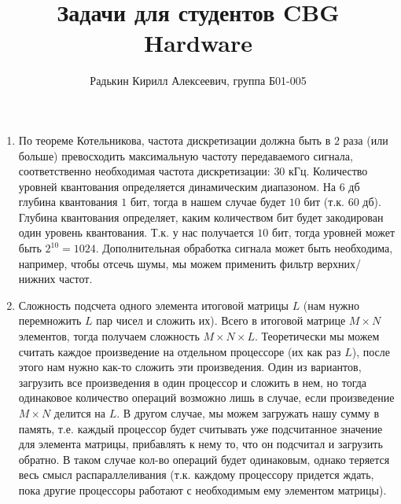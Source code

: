 \documentclass[a4paper, 12pt]{article}
\author{Радькин Кирилл Алексеевич, группа Б01-005}
\date{}
\title{Задачи для студентов CBG Hardware}
\begin{document}
    \maketitle

    \begin{enumerate}
        \item По теореме Котельникова, частота дискретизации должна быть в $2$ раза (или больше) превосходить максимальную частоту передаваемого сигнала, соответственно необходимая частота дискретизации: $30$ кГц.
        Количество уровней квантования определяется динамическим диапазоном. На $6$ дб глубина квантования $1$ бит, тогда в нашем случае будет $10$ бит (т.к. $60$ дб). Глубина квантования определяет, каким количеством бит будет закодирован один уровень квантования. Т.к. у нас получается $10$ бит, тогда уровней может быть $2^{10} = 1024$.
        Дополнительная обработка сигнала может быть необходима, например, чтобы отсечь шумы, мы можем применить фильтр верхних/нижних частот.

        \item Сложность подсчета одного элемента итоговой матрицы $L$ (нам нужно перемножить $L$ пар чисел и сложить их). Всего в итоговой матрице $M \times N$ элементов, тогда получаем сложность $M \times N \times L$. 
        Теоретически мы можем считать каждое произведение на отдельном процессоре (их как раз $L$), после этого нам нужно как-то сложить эти произведения. Один из вариантов, загрузить все произведения в один процессор и сложить в нем, но тогда одинаковое количество операций возможно лишь в случае, если произведение $M \times N$ делится на $L$. В другом случае, мы можем загружать нашу сумму в память, т.е. каждый процессор будет считывать уже подсчитанное значение для элемента матрицы, прибавлять к нему то, что он подсчитал и загрузить обратно. В таком случае кол-во операций будет одинаковым, однако теряется весь смысл распараллеливания (т.к. каждому процессору придется ждать, пока другие процессоры работают с необходимым ему элементом матрицы).


\end{enumerate}
\end{document}
